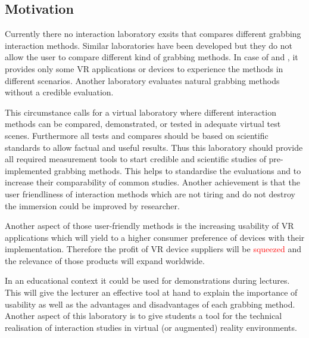 \subsection{Motivation}\label{sec:Motivation}

Currently there no interaction laboratory exsits that compares different grabbing interaction methods. Similar laboratories \cite{lin2016towards}\cite{website:TU}\cite{website:steam} have been developed but they do not allow the user to compare different kind of grabbing methods. In case of \cite{website:steam} and \cite{website:TU}, it provides only some VR applications or devices to experience the methods in different scenarios. Another \cite{lin2016towards} laboratory evaluates natural grabbing methods without a credible evaluation.
  
This circumstance calls for a virtual laboratory where different interaction methods can be compared, demonstrated, or tested in adequate virtual test scenes. Furthermore all tests and compares should be based on scientific standards to allow factual and useful results. Thus this laboratory should provide all required measurement tools to start credible and scientific studies of pre-implemented grabbing methods. This helps to standardise the evaluations and to increase their comparability of common studies. Another achievement is that the user friendliness of interaction methods which are not tiring and do not destroy the immersion could be improved by researcher. 

Another aspect of those user-friendly methods is the increasing usability of VR applications which will yield to a higher consumer preference of devices with their implementation. Therefore the profit of VR device suppliers will be \textcolor{red}{squeezed} and the relevance of those products will expand worldwide. 

In an educational context it could be used for demonstrations during lectures. This will give the lecturer an effective tool at hand to explain the importance of usability as well as the advantages and disadvantages of each grabbing method. Another aspect of this laboratory is to give students a tool for the technical realisation of interaction studies in virtual (or augmented) reality environments.

